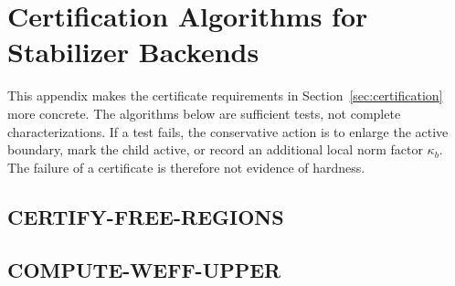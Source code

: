 \section{Certification Algorithms for Stabilizer Backends}
\label{app:certification}

This appendix makes the certificate requirements in Section~\ref{sec:certification} more concrete. The algorithms below are sufficient tests, not complete characterizations. If a test fails, the conservative action is to enlarge the active boundary, mark the child active, or record an additional local norm factor \(\kappa_b\). The failure of a certificate is therefore not evidence of hardness.

\subsection{CERTIFY-FREE-REGIONS}

\begin{center}
\end{center}

\subsection{COMPUTE-WEFF-UPPER}


